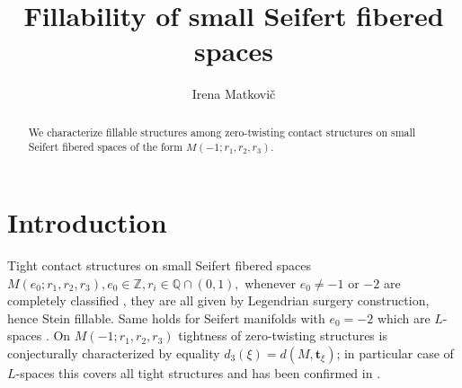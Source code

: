 \documentclass{amsart}
\theoremstyle{definition}
\begin{document}
\title[Fillability of small Seifert fibered spaces]{Fillability of small Seifert fibered spaces}

\author{Irena Matkovi\v{c}}
\address{Department of Mathematics, Central European University, 1051 Budapest, Hungary}

\begin{abstract}
We characterize fillable structures among zero-twisting contact structures on small Seifert fibered spaces of the form $M(-1;r_1,r_2,r_3)$.
\end{abstract}


\maketitle

\section{Introduction}
Tight contact structures on small Seifert fibered spaces $M(e_0;r_1,r_2,r_3), e_0\in{\mathbb Z}, r_i\in{\mathbb Q}\cap(0,1),$ whenever $e_0\neq -1$ or $-2$ are completely classified \cite{Wu, GLS0}, they are all given by Legendrian surgery construction, hence Stein fillable. Same holds for Seifert manifolds with $e_0=-2$ which are $L$-spaces \cite{G}. On $M(-1;r_1,r_2,r_3)$ tightness of zero-twisting structures is conjecturally \cite{S} characterized by equality $d_3(\xi)=d(M,\mathbf{t}_\xi)$; in particular case of $L$-spaces this covers all tight structures and has been confirmed in \cite{M}.
\end{document}
